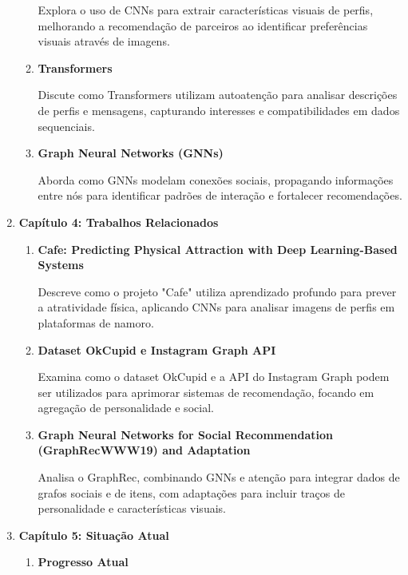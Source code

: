 \begin{enumerate}
\begin{enumerate}
        Explora o uso de CNNs para extrair características visuais de perfis, melhorando a recomendação de parceiros ao identificar preferências visuais através de imagens.

        \item \textbf{Transformers}
        
        Discute como Transformers utilizam autoatenção para analisar descrições de perfis e mensagens, capturando interesses e compatibilidades em dados sequenciais.

        \item \textbf{Graph Neural Networks (GNNs)}
        
        Aborda como GNNs modelam conexões sociais, propagando informações entre nós para identificar padrões de interação e fortalecer recomendações.

        
    \end{enumerate}
    
    \item \textbf{Capítulo 4: Trabalhos Relacionados}
    \begin{enumerate}
        \item \textbf{Cafe: Predicting Physical Attraction with Deep Learning-Based Systems}
        
        Descreve como o projeto "Cafe" utiliza aprendizado profundo para prever a atratividade física, aplicando CNNs para analisar imagens de perfis em plataformas de namoro.

        \item \textbf{Dataset OkCupid e Instagram Graph API}
        
        Examina como o dataset OkCupid e a API do Instagram Graph podem ser utilizados para aprimorar sistemas de recomendação, focando em agregação de personalidade e social.
        \item \textbf{Graph Neural Networks for Social Recommendation (GraphRecWWW19) and Adaptation}
        
        Analisa o GraphRec, combinando GNNs e atenção para integrar dados de grafos sociais e de itens, com adaptações para incluir traços de personalidade e características visuais.
    \end{enumerate}

    \item \textbf{Capítulo 5: Situação Atual}
    \begin{enumerate}
        \item \textbf{Progresso Atual}
        

\end{enumerate}
\end{enumerate}
